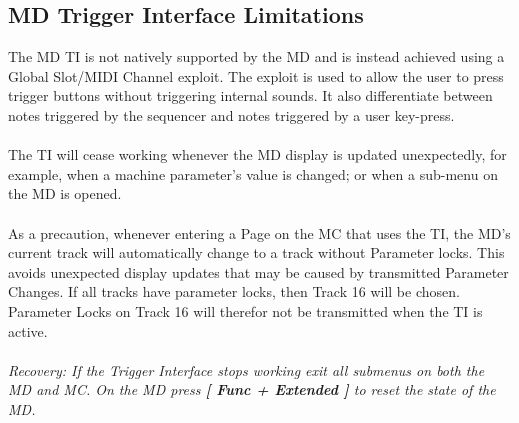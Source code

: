 \subsection{MD Trigger Interface Limitations}
The MD TI is not natively supported by the MD and is instead achieved using a Global Slot/MIDI Channel exploit. The exploit is used to allow the user to press trigger buttons without triggering internal sounds. It also differentiate between notes triggered by the sequencer and notes triggered by a user key-press.\\
\\
The TI will cease working whenever the MD display is updated unexpectedly, for example, when a machine parameter's value is changed; or when a sub-menu on the MD is opened.\\
\\
As a precaution, whenever entering a Page on the MC that uses the TI, the MD's current track will automatically change to a track without Parameter locks. This avoids unexpected display updates that may be caused by transmitted Parameter Changes. If all tracks have parameter locks, then Track 16 will be chosen. Parameter Locks on Track 16 will therefor not be transmitted when the TI is active.\\
\\
\textit{Recovery: If the Trigger Interface stops working exit all submenus on both the MD and MC. On the MD press \textbf{[ Func + Extended ]} to reset the state of the MD.}



